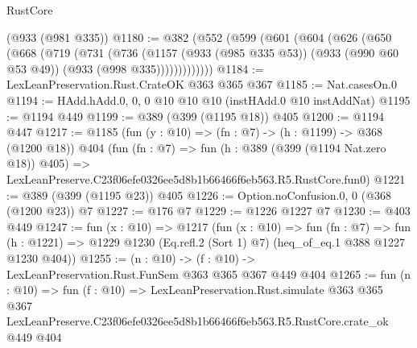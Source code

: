 \begin{lexlean}{RustCore}
\begin{coremodule}
    (@933 (@981 @335))
@1180 := @382
    (@552
      (@599
        (@601
          (@604
            (@626
              (@650
                (@668
                  (@719
                    (@731
                      (@736
                        (@1157
                          (@933 (@985 @335 @53))
                          (@933 (@990 @60 @53 @49))
                          (@933 (@998 @335)))))))))))))
@1184 := LexLeanPreservation.Rust.CrateOK @363 @365 @367
@1185 := Nat.casesOn.{0}
@1194 := HAdd.hAdd.{0, 0, 0} @10 @10 @10 (instHAdd.{0} @10 instAddNat)
@1195 := @1194 @449
@1199 := @389 (@399 (@1195 @18)) @405
@1200 := @1194 @447
@1217 := @1185
    (fun (y : @10) => (fn : @7) -> (h : @1199) -> @368 (@1200 @18))
    @404
    (fun (fn : @7) =>
    fun (h : @389 (@399 (@1194 Nat.zero @18)) @405) =>
    LexLeanPreserve.C23f06efe0326ee5d8b1b66466f6eb563.R5.RustCore.fun0)
@1221 := @389 (@399 (@1195 @23)) @405
@1226 := Option.noConfusion.{0, 0} (@368 (@1200 @23)) @7
@1227 := @176 @7
@1229 := @1226 @1227 @7
@1230 := @403 @449
@1247 := fun (x : @10) =>
  @1217
    (fun (x : @10) =>
    fun (fn : @7) =>
    fun (h : @1221) => @1229 @1230 (Eq.refl.{2} (Sort 1) @7) (heq_of_eq.{1} @388 @1227 @1230 @404))
@1255 := (n : @10) -> (f : @10) -> LexLeanPreservation.Rust.FunSem @363 @365 @367 @449 @404
@1265 := fun (n : @10) =>
  fun (f : @10) =>
  LexLeanPreservation.Rust.simulate
    @363
    @365
    @367
    LexLeanPreserve.C23f06efe0326ee5d8b1b66466f6eb563.R5.RustCore.crate_ok
    @449
    @404
\end{coremodule}
\end{lexlean}
